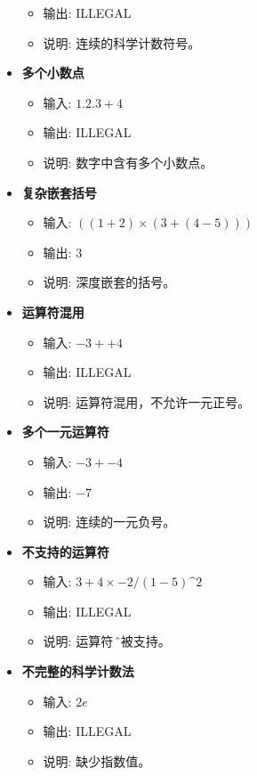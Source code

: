 \documentclass{article}
\begin{document}
\begin{itemize}
\begin{itemize}
        \item 输出: ILLEGAL
        \item 说明: 连续的科学计数符号。
    \end{itemize}
    \item \textbf{多个小数点}
    \begin{itemize}
        \item 输入: \(1.2.3 + 4\)
        \item 输出: ILLEGAL
        \item 说明: 数字中含有多个小数点。
    \end{itemize}
    \item \textbf{复杂嵌套括号}
    \begin{itemize}
        \item 输入: \(((1 + 2) \times (3 + (4 - 5)))\)
        \item 输出: \(3\)
        \item 说明: 深度嵌套的括号。
    \end{itemize}
    \item \textbf{运算符混用}
    \begin{itemize}
        \item 输入: \(-3 + +4\)
        \item 输出: ILLEGAL
        \item 说明: 运算符混用，不允许一元正号。
    \end{itemize}
    \item \textbf{多个一元运算符}
    \begin{itemize}
        \item 输入: \(-3 + -4\)
        \item 输出: \(-7\)
        \item 说明: 连续的一元负号。
    \end{itemize}
    \item \textbf{不支持的运算符}
    \begin{itemize}
        \item 输入: \(3 + 4 \times -2 / (1 - 5)\^2\)
        \item 输出: ILLEGAL
        \item 说明: 运算符 \^ 不被支持。
    \end{itemize}
    \item \textbf{不完整的科学计数法}
    \begin{itemize}
        \item 输入: \(2e\)
        \item 输出: ILLEGAL
        \item 说明: 缺少指数值。

\end{itemize}
\end{itemize}
\end{document}
